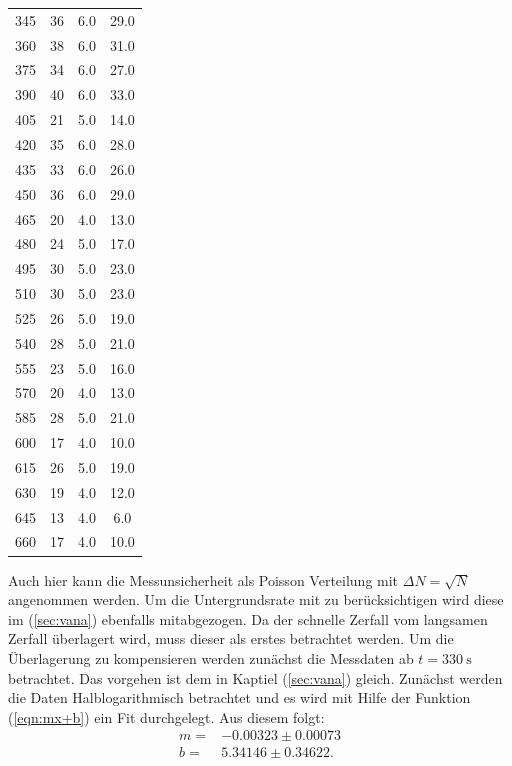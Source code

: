 \begin{table}
\begin{tabular}{c c c c}
		345  	&  36  	&  6.0         	&  29.0 \\
		360  	&  38  	&  6.0         	&  31.0 \\
		375  	&  34  	&  6.0         	&  27.0 \\
		390  	&  40  	&  6.0         	&  33.0 \\
		405  	&  21  	&  5.0         	&  14.0 \\
		420  	&  35  	&  6.0         	&  28.0 \\
		435  	&  33  	&  6.0         	&  26.0 \\
		450  	&  36  	&  6.0         	&  29.0 \\
		465  	&  20  	&  4.0         	&  13.0 \\
		480  	&  24  	&  5.0         	&  17.0 \\
		495  	&  30  	&  5.0         	&  23.0 \\
		510  	&  30  	&  5.0         	&  23.0 \\
		525  	&  26  	&  5.0         	&  19.0 \\
		540  	&  28  	&  5.0         	&  21.0 \\
		555  	&  23  	&  5.0         	&  16.0 \\
		570  	&  20  	&  4.0         	&  13.0 \\
		585  	&  28  	&  5.0         	&  21.0 \\
		600  	&  17  	&  4.0         	&  10.0 \\
		615  	&  26  	&  5.0         	&  19.0 \\
		630  	&  19  	&  4.0         	&  12.0 \\
		645  	&  13  	&  4.0         	&   6.0 \\
		660  	&  17  	&  4.0         	&  10.0 \\
		\bottomrule
	\end{tabular}
\end{table}
\noindent
Auch hier kann die Messunsicherheit als Poisson Verteilung mit $\Delta N = \sqrt{N}$ angenommen werden. Um die Untergrundsrate mit zu berücksichtigen wird diese im (\ref{sec:vana}) ebenfalls 
mitabgezogen.
\noindent
Da der schnelle Zerfall vom langsamen Zerfall überlagert wird, muss dieser als erstes betrachtet werden. Um die Überlagerung zu kompensieren werden zunächst die Messdaten ab 
$t = \SI{330}{\second}$ betrachtet.
Das vorgehen ist dem in Kaptiel (\ref{sec:vana}) gleich. 
\noindent
Zunächst werden die Daten Halblogarithmisch betrachtet und es wird mit Hilfe der Funktion (\ref{eqn:mx+b}) ein Fit durchgelegt. Aus diesem folgt:
\begin{align*}
    m =& -0.00323 \pm 0.00073 \\
    b =& 5.34146 \pm  0.34622.
\end{align*}

